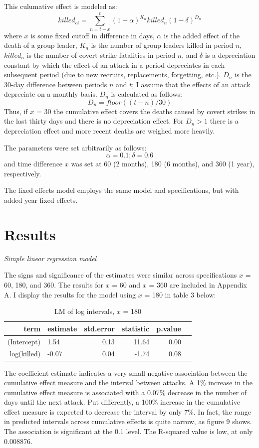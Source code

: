 \documentclass[letterpaper,12pt]{article}
\theoremstyle{definition}
\begin{document}
This culumative effect is modeled as:
$$killed_{ct} = \sum_{n=t-x}^{t} (1 + \alpha)^{K_n}killed_{n}(1-\delta)^{D_{n}}$$
where $x$ is some fixed cutoff in difference in days, $\alpha$ is the added effect of the death of a group leader, $K_{n}$ is the number of group leaders killed in period $n$, $killed_{n}$ is the number of covert strike fatalities in period $n$, and $\delta$ is a depreciation constant by which the effect of an attack in a period depreciates in each subsequent period (due to new recruits, replacements, forgetting, etc.). $D_{n}$ is the 30-day difference between periods $n$ and $t$; I assume that the effects of an attack depreciate on a monthly basis. $D_{n}$ is calculated as follows:
$$D_{n} = floor((t - n)/30)$$
Thus, if $x$ = 30 the cumulative effect covers the deaths caused by covert strikes in the last thirty days and there is no depreciation effect. For $D_{n} > 1$ there is a depreciation effect and more recent deaths are weighed more heavily.

The parameters were set arbitrarily as follows: 
$$\alpha = 0.1; \delta = 0.6$$
and time difference $x$ was set at 60 (2 months), 180 (6 months), and 360 (1 year), respectively.

The fixed effects model employs the same model and specifications, but with added year fixed effects.

\section{Results}
\noindent\textit{Simple linear regression model}

The signs and significance of the estimates were similar across specifications $x$ = 60, 180, and 360. The results for $x$ = 60 and $x$ = 360 are included in Appendix A. I display the results for the model using $x$ = 180 in table 3 below:

\begin{table}[!htb]
\centering
\caption {LM of log intervals, $x$ = 180}
\begin{tabular}{rlrrrr}
  \hline
term & estimate & std.error & statistic & p.value \\ 
  \hline
(Intercept) & 1.54 & 0.13 & 11.64 & 0.00 \\ 
log(killed) & -0.07 & 0.04 & -1.74 & 0.08 \\ 
   \hline
\end{tabular}
\end{table}

The coefficient estimate indicates a very small negative association between the cumulative effect measure and the interval between attacks. A 1\% increase in the cumulative effect measure is associated with a 0.07\% decrease in the number of days until the next attack. Put differently, a 100\% increase in the cumulative effect measure is expected to decrease the interval by only 7\%. In fact, the range in predicted intervals across cumulative effects is quite narrow, as figure 9 shows. The association is significant at the 0.1 level. The R-squared value is low, at only 0.008876. \\
\end{document}
